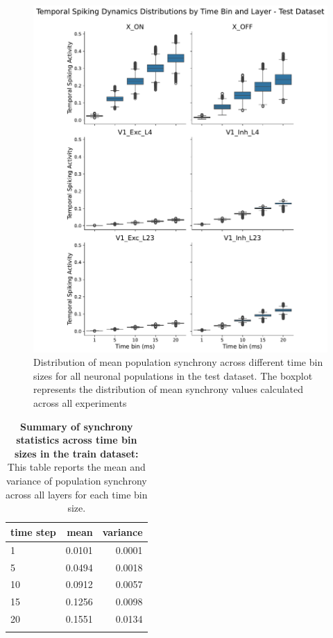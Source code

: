 \begin{figure}
    \centering
    \includegraphics[width=0.92\linewidth]{img/plots/synchrony_boxplot_time_bins_test.pdf}
    \caption{Distribution of mean population synchrony across different time bin sizes for all neuronal populations in the test dataset. The boxplot represents the distribution of mean synchrony values calculated across all experiments}
    \label{fig:boxplot_synchrony_time_test}
\end{figure}

\begin{table}
    \centering\footnotesize\sf
    \begin{tabular}{lrr}
    \toprule
    time step & mean & variance \\
    \midrule
    1 & 0.0101 & 0.0001 \\
    5 & 0.0494 & 0.0018 \\
    10 & 0.0912 & 0.0057 \\
    15 & 0.1256 & 0.0098 \\
    20 & 0.1551 & 0.0134 \\
    \addlinespace %
    \bottomrule
    \end{tabular}
    \caption{\textbf{Summary of synchrony statistics across time bin sizes in the train dataset:} This table reports the mean and variance of population synchrony across all layers for each time bin size.}
    \label{tab:synchrony_time_bins_summary_train}
\end{table}

